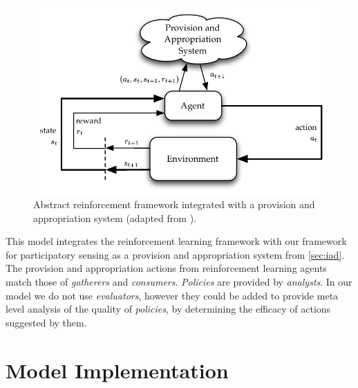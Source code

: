 \begin{figure}
\centering
\includegraphics{gfx/reinforcementlearning}
\caption[Abstract reinforcement framework integrated with a provision and appropriation system]{Abstract reinforcement framework integrated with a provision and appropriation system (adapted from \citet[p.52]{Sutton1998}).}\label{fig:reinflearn}
\end{figure}

This model integrates the reinforcement learning framework with our framework
for participatory sensing as a provision and appropriation system from
\autoref{sec:iad}. The provision and appropriation actions from reinforcement
learning agents match those of \emph{gatherers} and \emph{consumers}.
\emph{Policies} are provided by \emph{analysts}. In our model we do not use
\emph{evaluators}, however they could be added to provide meta level analysis
of the quality of \emph{policies}, by determining the efficacy of actions
suggested by them.



\section{Model Implementation}\label{sec:modelimpl}

